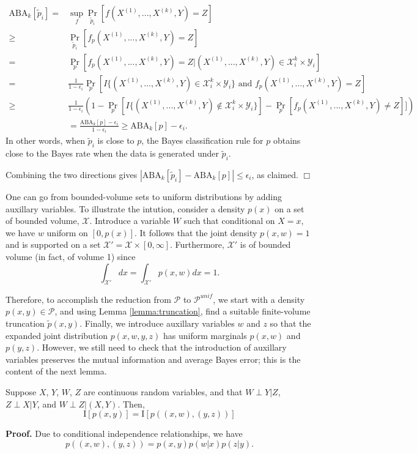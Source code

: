 \documentclass[12pt]{article}
\begin{document}
\begin{align*}
\text{ABA}_k[\tilde{p}_i] =& \sup_f \Pr_{\tilde{p}_i}[f(X^{(1)},...,X^{(k)}, Y) = Z]
\\\geq &  \Pr_{\tilde{p}_i}[f_p(X^{(1)},...,X^{(k)}, Y) = Z]
\\=& \Pr_p[f_p(X^{(1)},...,X^{(k)}, Y) = Z| (X^{(1)},...,X^{(k)}, Y)\in \mathcal{X}_i^k \times \mathcal{Y}_i]
\\=& \frac{1}{1-\epsilon_i} \Pr_p[I\{(X^{(1)},...,X^{(k)}, Y)\in \mathcal{X}_i^k \times \mathcal{Y}_i\} \text{ and }f_p(X^{(1)},...,X^{(k)}, Y) = Z]
\\\geq & \frac{1}{1-\epsilon_i} \left(1 - \Pr_p[I\{(X^{(1)},...,X^{(k)}, Y)\notin \mathcal{X}_i^k \times \mathcal{Y}_i\}] - \Pr_p[f_p(X^{(1)},...,X^{(k)}, Y) \neq Z]]\right)
\\&= \frac{\text{ABA}_k[p] - \epsilon_i}{1-\epsilon_i} \geq \text{ABA}_k[p] - \epsilon_i.
\end{align*}
In other words, when $\tilde{p}_i$ is close to $p$, the Bayes
classification rule for $p$ obtains close to the Bayes rate when the
data is generated under $\tilde{p}_i$.

Combining the two directions gives $|\text{ABA}_k[\tilde{p}_i]
- \text{ABA}_k[p]| \leq \epsilon_i$, as claimed. $\Box$

One can go from bounded-volume sets to uniform distributions by adding
auxillary variables.  To illustrate the intution, consider a density
$p(x)$ on a set of bounded volume, $\mathcal{X}$.  Introduce a
variable $W$ such that conditional on $X = x$, we have $w$ uniform on
$[0, p(x)]$.  It follows that the joint density $p(x, w) = 1$ and is
supported on a set $\mathcal{X}' = \mathcal{X} \times [0,\infty]$.
Furthermore, $\mathcal{X}'$ is of bounded volume (in fact, of volume 1) since
\[
\int_{\mathcal{X}'} dx = \int_{\mathcal{X}'} p(x, w) dx = 1.
\]

Therefore, to accomplish the reduction from $\mathcal{P}$ to
$\mathcal{P}^{unif}$, we start with a density
$p(x,y) \in \mathcal{P}$, and using Lemma \ref{lemma:truncation},
find a suitable finite-volume truncation $\tilde{p}(x, y).$ Finally,
we introduce auxillary variables $w$ and $z$ so that the expanded
joint distribution $p(x, w, y, z)$ has uniform marginals $p(x, w)$ and
$p(y, z)$.  However, we still need to check that the introduction of
auxillary variables preserves the mutual information and average Bayes
error; this is the content of the next lemma.

\begin{lemma}
Suppose $X$, $Y$, $W$, $Z$ are continuous random variables, and that
$W\perp Y|Z$, $Z \perp X|Y$, and $W \perp Z|(X,Y)$.  Then,
\[
\text{I}[p(x, y)] = \text{I}[p((x,w), (y,z))]
\]
\end{lemma}
\textbf{Proof.}
Due to conditional independence relationships, we have
\[
p((x,w), (y,z)) = p(x,y)p(w|x)p(z|y).
\]
\end{document}
